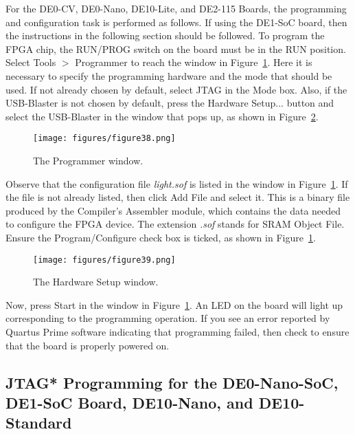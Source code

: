 For the DE0-CV, DE0-Nano, DE10-Lite, and DE2-115 Boards, the
programming and configuration task is performed as follows. If using the DE1-SoC board,
then the instructions in the following section should be followed.
To program the FPGA chip, the RUN/PROG switch on the board must be in the RUN position.
Select {\sf Tools $>$ Programmer} to reach the window in Figure~\ref{fig:38}.
Here it is necessary to specify the programming hardware and 
the mode that should be used. If not already chosen by default, 
select JTAG in the Mode box.
Also, if the USB-Blaster is not chosen by default, press the 
{\sf Hardware Setup...} button and select the USB-Blaster in the window
that pops up, as shown in Figure~\ref{fig:39}.

\begin{figure}[H]
   \begin{center}
      \texttt{[image: figures/figure38.png]}
   \caption{The Programmer window.} 
	 \label{fig:38}
	 \end{center}
\end{figure}

Observe that the configuration file {\it light.sof} is listed in the window in
Figure~\ref{fig:38}. If the file is not already listed, then click {\sf Add File}
and select it.
This is a binary file produced by the Compiler's Assembler module, 
which contains the data needed to configure the FPGA device.
The extension {\it .sof} stands for SRAM Object File.
Ensure the {\sf Program/Configure} check box is ticked, as shown in Figure~\ref{fig:38}.

\begin{figure}[H]
   \begin{center}
      \texttt{[image: figures/figure39.png]}
   \caption{The Hardware Setup window.} 
	 \label{fig:39}
	 \end{center}
\end{figure}

Now, press {\sf Start} in the window in Figure~\ref{fig:38}.
An LED on the board will light up corresponding to the programming operation.
If you see an error reported by Quartus Prime software indicating that
programming failed, then check to ensure that the board is properly powered on.

\subsection{JTAG* Programming for the DE0-Nano-SoC, DE1-SoC Board, DE10-Nano, and DE10-Standard}

